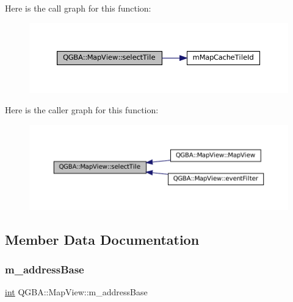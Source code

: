 Here is the call graph for this function\+:
\nopagebreak
\begin{figure}[H]
\begin{center}
\leavevmode
\includegraphics[width=350pt]{class_q_g_b_a_1_1_map_view_a562f195c2a34eb5f07be9f0d865e7d06_cgraph}
\end{center}
\end{figure}
Here is the caller graph for this function\+:
\nopagebreak
\begin{figure}[H]
\begin{center}
\leavevmode
\includegraphics[width=350pt]{class_q_g_b_a_1_1_map_view_a562f195c2a34eb5f07be9f0d865e7d06_icgraph}
\end{center}
\end{figure}


\subsection{Member Data Documentation}
\mbox{\label{class_q_g_b_a_1_1_map_view_a85204eb6bbc262f29325e86d6f60a5dc}} 
\subsubsection{\texorpdfstring{m\+\_\+address\+Base}{m\_addressBase}}
{\footnotesize\ttfamily \mbox{\hyperlink{ioapi_8h_a787fa3cf048117ba7123753c1e74fcd6}{int}} Q\+G\+B\+A\+::\+Map\+View\+::m\+\_\+address\+Base\hspace{0.3cm}{\ttfamily [private]}}

